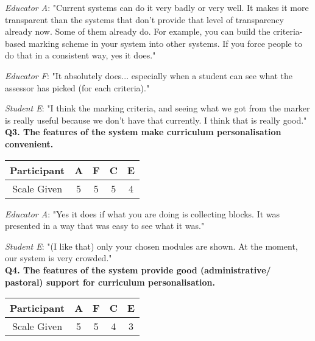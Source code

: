 \textit{Educator A}: "Current systems can do it very badly or very well. It makes it more transparent than
the systems that don't provide that level of transparency already now. Some of them already do. For example,
you can build the criteria-based marking scheme in your system into other systems. If you force people to do that
in a consistent way, yes it does."

\textit{Educator F}: "It absolutely does...
especially when a student can see what the assessor has picked (for each criteria)."

\textit{Student E}: "I think the marking criteria, and seeing what we got from the marker is really useful 
because we don't have that currently. I think that is really good."\\

\textbf{Q3. The features of the system make curriculum personalisation convenient.}\\
\begin{table}[!ht]
	\centering
	\begin{tabularx}{0.325\textwidth}{|c|c|c|c|c|}
		\hline
		Participant & A                  & F                  & C                  & E \\
		\hline
		Scale Given & \cellcolor{green}5 & \cellcolor{green}5 & \cellcolor{green}5 & \cellcolor{SpringGreen}4 \\
		\hline
	\end{tabularx}
\end{table}

\textit{Educator A}: "Yes it does if what you are doing is collecting blocks. It was presented in a way that was
easy to see what it was."

\textit{Student E}: "(I like that) only your chosen modules are shown. At the moment, our system is very crowded."\\

\textbf{Q4. The features of the system provide good (administrative/ pastoral) support for curriculum personalisation.}\\
\begin{table}[!ht]
	\centering
	\begin{tabularx}{0.325\textwidth}{|c|c|c|c|c|}
		\hline
		Participant & A                  & F                  & C                  & E \\
		\hline
		Scale Given & \cellcolor{green}5 & \cellcolor{green}5 & \cellcolor{green}4 & \cellcolor{Dandelion}3 \\
		\hline
	\end{tabularx}
\end{table}

